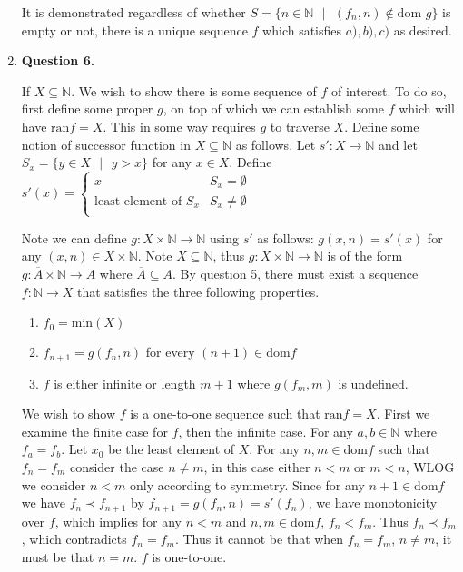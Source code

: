\documentclass{article}
\begin{document}
\begin{enumerate}
		 \medskip
		 It is demonstrated regardless of whether $S = \{n \in \mathbb{N} \text{ } | \text{ } (f_n, n) \notin \text{dom } g\}$ is empty or not, there is a unique sequence $f$ which satisfies $a),b),c)$ as desired.
		 
		 \item \textbf{Question 6.}
		 
		 \medskip
		 If $X \subseteq \mathbb{N}$. We wish to show there is some sequence of $f$ of interest. To do so, first define some proper $g$, on top of which we can establish some $f$ which will have $\text{ran} f = X$. This in some way requires $g$ to traverse $X$. Define some notion of successor function in $X \subseteq \mathbb{N}$ as follows. Let $s': X \xrightarrow{} \mathbb{N}$ and let $S_x = \{y \in X \text{ } | \text{ } y > x\}$ for any $x \in X$. Define $s'(x) = 
		 \begin{cases}
		 	x & S_x = \emptyset\\
		        \text{least element of } S_x & S_x \neq \emptyset\\
		 \end{cases}$
		
		 Note we can define $g: X \times \mathbb{N} \xrightarrow{} \mathbb{N}$ using $s'$ as follows: $g(x, n) = s'(x)$ for any $(x,n) \in X \times \mathbb{N}$. Note $X \subseteq \mathbb{N}$, thus $g: X \times \mathbb{N} \xrightarrow{} \mathbb{N}$ is of the form $g: \overline{A} \times \mathbb{N} \xrightarrow{} A$ where $\overline{A} \subseteq A$. By question 5, there must exist a sequence $f: \mathbb{N} \xrightarrow{} X$ that satisfies the three following properties.
		 
		 \begin{enumerate}
		 	\item $f_0 =  \text{min}(X)$
			\item $f_{n + 1} = g(f_n, n)$ for every $(n + 1) \in \text{dom} f$
			\item $f$ is either infinite or length $m + 1$ where $g(f_m, m)$ is undefined.
		 \end{enumerate}
		
		We wish to show $f$ is a one-to-one sequence such that $\text{ran} f = X$. First we examine the finite case for $f$, then the infinite case. For any $a,b \in \mathbb{N}$ where $f_a = f_b$. Let $x_0$ be the least element of $X$. For any $n,m \in \text{dom} f$ such that $f_n = f_m$ consider the case $n \neq m$, in this case either $n < m$ or $m < n$, WLOG we consider $n < m$ only according to symmetry. Since for any $n + 1 \in \text{dom} f$ we have $f_{n} \prec f_{n + 1}$ by $f_{n + 1} = g(f_n, n) = s'(f_n)$, we have monotonicity over $f$, which implies for any $n < m$ and $n, m \in \text{dom} f$, $f_n < f_m$. Thus $f_n \prec f_m$, which contradicts $f_n = f_m$. Thus it cannot be that when $f_n = f_m$, $n \neq m$, it must be that $n = m$.  $f$ is one-to-one.
		

\end{enumerate}
\end{document}
